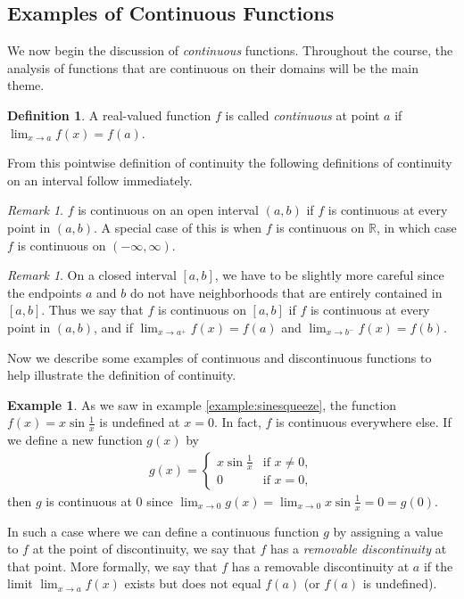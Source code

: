 \documentclass[11pt,oneside,reqno]{amsart}
\newcommand\R{{\mathbb R}}
\numberwithin{equation}{section}
\theoremstyle{definition}
\newtheorem{definition}[theorem]{Definition}
\newtheorem{example}[theorem]{Example}
\theoremstyle{remark}
\newtheorem{remark}[theorem]{Remark}
\begin{document}
\subsection{Examples of Continuous Functions}
We now begin the discussion of \textit{continuous} functions. Throughout the course, the analysis of functions that are continuous on their domains will be the main theme. 
\begin{definition}
    A real-valued function $f$ is called \textit{continuous} at point $a$ if $\lim_{x\to a} f(x) = f(a)$.
\end{definition}
From this pointwise definition of continuity the following definitions of continuity on an interval follow immediately. 
\begin{remark}
    $f$ is continuous on an open interval $(a,b)$ if $f$ is continuous at every point in $(a,b)$. A special case of this is when $f$ is continuous on $\R$, in which case 
    $f$ is continuous on $(-\infty, \infty)$. 
\end{remark}
\begin{remark}
    On a closed interval $[a,b]$, we have to be slightly more careful since the endpoints $a$ and $b$ do not have neighborhoods that are entirely contained in $[a,b]$. 
    Thus we say that $f$ is continuous on $[a,b]$ if $f$ is continuous at every point in $(a,b)$, and if $\lim_{x\to a^+} f(x) = f(a)$ and $\lim_{x\to b^-} f(x) = f(b)$.
\end{remark}
    Now we describe some examples of continuous and discontinuous functions to help illustrate the definition of continuity.
\begin{example}
    As we saw in example \ref{example:sinesqueeze}, the function $f(x) = x \sin\frac{1}{x}$ is undefined at $x = 0$. In fact, $f$ is continuous everywhere else. If we define a new function $g(x)$ by
\begin{align*}
    g(x) = \begin{cases}
    x \sin\frac{1}{x} & \text{if } x \neq 0,\\
    0 & \text{if } x = 0,
\end{cases}
\end{align*}
then $g$ is continuous at $0$ since $\lim_{x\to0} g(x) = \lim_{x\to0} x \sin\frac{1}{x} = 0 = g(0)$.
\end{example}
In such a case where we can define a continuous function $g$ by assigning a value to $f$ at the point of discontinuity, we say that $f$ has a \textit{removable discontinuity} at that point.
More formally, we say that $f$ has a removable discontinuity at $a$ if the limit $\lim_{x\to a} f(x)$ exists but does not equal $f(a)$ (or $f(a)$ is undefined).
\end{document}
